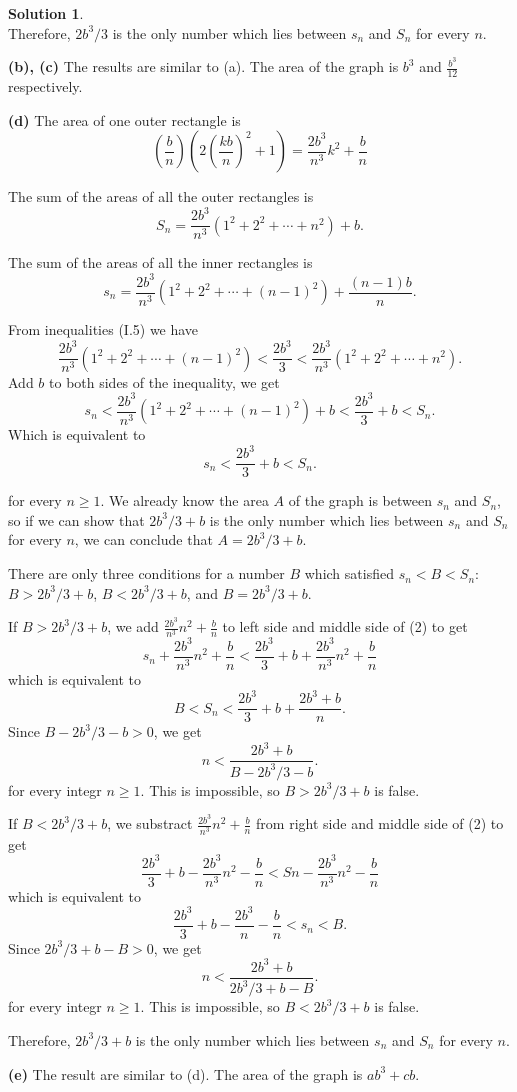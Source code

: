 \documentclass[11pt,a4paper]{book}
\theoremstyle{definition}
\newtheorem{solution}{Solution}
\begin{document}
\begin{solution}{\ \\}
  Therefore, $2b^3/3$ is the only number which lies between $s_n$ and $S_n$ for every $n$.

  \vspace{2\baselineskip}
  \textbf{(b), (c)} The results are similar to (a). The area of the graph is $b^3$ and $\frac{b^3}{12}$ respectively.

  \vspace{2\baselineskip}
  \textbf{(d)} The area of one outer rectangle is
  \[
  \left( \frac{b}{n} \right) \left( 2 \left( \frac{kb}{n} \right)^2 + 1 \right) = \frac{2b^3}{n^3}k^2 + \frac{b}{n}
  \]

  The sum of the areas of all the outer rectangles is
  \[
    S_n = \frac{2b^3}{n^3} \left( 1^2 + 2^2 + \cdots + n^2 \right) + b.
  \]

  The sum of the areas of all the inner rectangles is
  \[
    s_n = \frac{2b^3}{n^3} \left( 1^2 + 2^2 + \cdots + (n-1)^2 \right) + \frac{(n-1)b}{n}.
  \]

  From inequalities (I.5) we have
  \[
  \frac{2b^3}{n^3} \left(1^2 + 2^2 + \cdots + (n-1)^2 \right) < \frac{2b^3}{3} < \frac{2b^3}{n^3} \left( 1^2 + 2^2 + \cdots + n^2 \right).
  \]
  Add $b$ to both sides of the inequality, we get
  \[
  s_n < \frac{2b^3}{n^3}\left( 1^2 + 2^2 + \cdots + (n-1)^2 \right) + b < \frac{2b^3}{3} + b < S_n.
  \]
  Which is equivalent to
  \[
  s_n < \frac{2b^3}{3} + b < S_n. \tag{2}
  \]

  for every $n \ge 1$. We already know the area $A$ of the graph is between $s_n$ and $S_n$, so if we can 
  show that $2b^3/3 + b$ is the only number which lies between $s_n$ and $S_n$ for every $n$, we can conclude that $A = 2b^3/3 + b$.

  There are only three conditions for a number $B$ which satisfied $s_n < B < S_n$: $B > 2b^3/3 + b$, $B < 2b^3/3 + b$, and $B = 2b^3/3 + b$.

  If $B > 2b^3/3 + b$, we add $\frac{2b^3}{n^3}n^2 + \frac{b}{n}$ to left side and middle side of (2) to get
  \[
  s_n + \frac{2b^3}{n^3}n^2 + \frac{b}{n} < \frac{2b^3}{3} + b + \frac{2b^3}{n^3}n^2 + \frac{b}{n}
  \]
  which is equivalent to
  \[
  B < S_n < \frac{2b^3}{3} + b + \frac{2b^3 + b}{n}.
  \]
  Since $B - 2b^3/3 - b > 0$, we get
  \[
  n < \frac{2b^3 + b}{B - 2b^3/3 - b}.
  \]
  for every integr $n \ge 1$. This is impossible, so $B > 2b^3/3 + b$ is false.

  If $B < 2b^3/3 + b$, we substract $\frac{2b^3}{n^3}n^2 + \frac{b}{n}$ from right side and middle side of (2) to get
  \[
  \frac{2b^3}{3} + b - \frac{2b^3}{n^3}n^2 - \frac{b}{n} < Sn - \frac{2b^3}{n^3}n^2 - \frac{b}{n}
  \]
  which is equivalent to
  \[
  \frac{2b^3}{3} + b - \frac{2b^3}{n} - \frac{b}{n} < s_n < B.
  \]
  Since $2b^3/3 + b - B > 0$, we get
  \[
  n < \frac{2b^3 + b}{2b^3/3 + b - B}.
  \]
  for every integr $n \ge 1$. This is impossible, so $B < 2b^3/3 + b$ is false.

  Therefore, $2b^3/3 + b$ is the only number which lies between $s_n$ and $S_n$ for every $n$.

  \vspace{2\baselineskip}
  \textbf{(e)} The result are similar to (d). The area of the graph is $ab^3 + cb$.
\end{solution}
\end{document}
